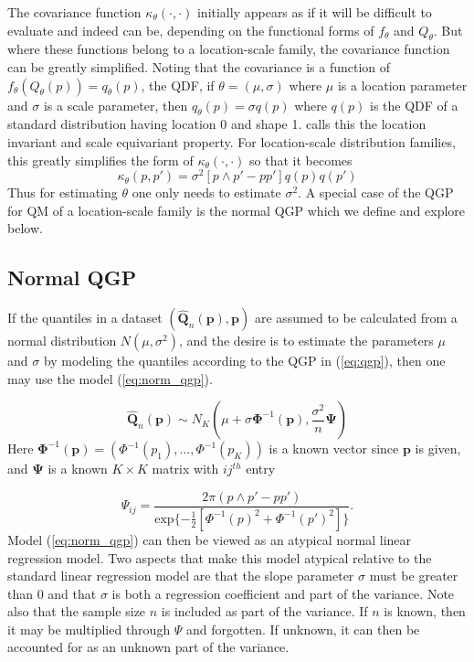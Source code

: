 \documentclass[preprint,12pt,authoryear]{elsarticle}
\begin{document}
The covariance function $\kappa_{\theta} (\cdot, \cdot)$ initially appears as if it will be difficult to evaluate and indeed can be, depending on the functional forms of $f_{\theta}$ and $Q_{\theta}$. But where these functions belong to a location-scale family, the covariance function can be greatly simplified. 
Noting that the covariance is a function of $f_{\theta}(Q_{\theta}(p)) = q_{\theta}(p)$, the QDF, if $\theta = (\mu, \sigma)$ where $\mu$ is a location parameter and $\sigma$ is a scale parameter, then $q_{\theta}(p) = \sigma q(p)$ where $q(p)$ is the QDF of a standard distribution having location 0 and shape 1. \cite{staudte2017shapes} calls this the location invariant and scale equivariant property. For location-scale distribution families, this greatly simplifies the form of $\kappa_{\theta}(\cdot,\cdot)$ so that it becomes
\[
    \kappa_{\theta}(p, p') = \sigma^{2}[p\wedge p' - p p'] q(p)q(p') 
\] 
Thus for estimating $\theta$ one only needs to estimate $\sigma^2$. A special case of the QGP for QM of a location-scale family is the normal QGP which we define and explore below.


\subsection{Normal QGP}

If the quantiles in a dataset $(\hat{\boldsymbol{Q}}_n(\boldsymbol{p}),\boldsymbol{p})$ are assumed to be calculated from a normal distribution $N(\mu, \sigma^2)$, and the desire is to estimate the parameters $\mu$ and $\sigma$ by modeling the quantiles according to the QGP in (\ref{eq:qgp}), then one may use the model (\ref{eq:norm_qgp}). 

\begin{equation}
    \label{eq:norm_qgp}
\hat{\boldsymbol{Q}}_n(\boldsymbol{p}) \sim N_K \left( \mu + \sigma \boldsymbol{\Phi}^{-1}(\boldsymbol{p}),\frac{\sigma^2}{n} \boldsymbol{\Psi} \right)
\end{equation}
Here $\boldsymbol{\Phi}^{-1}(\boldsymbol{p}) = (\Phi^{-1}(p_1), ..., \Phi^{-1}(p_K))$ is a known vector since $\boldsymbol{p}$ is given, and $\boldsymbol{\Psi}$ is a known $K\times K$ matrix with $ij^{th}$ entry

\[
    \Psi_{ij} = \frac{2 \pi (p\wedge p' - p p')}{\text{exp}\{-\frac{1}{2}[\Phi^{-1}(p)^2 + \Phi^{-1}(p')^2]\}}.
\]
Model (\ref{eq:norm_qgp}) can then be viewed as an atypical normal linear regression model. Two aspects that make this model atypical relative to the standard linear regression model are that the slope parameter $\sigma$ must be greater than 0 and that $\sigma$ is both a regression coefficient and part of the variance.
Note also that the sample size $n$ is included as part of the variance. If $n$ is known, then it may be multiplied through $\Psi$ and forgotten. If unknown, it can then be accounted for as an unknown part of the variance. 
\end{document}
